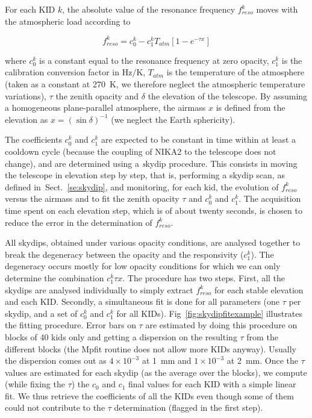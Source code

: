 For each KID $k$, the absolute value of the resonance frequency
$f_{reso}^k$ moves with the atmospheric load according to

\begin{equation}
f_{reso}^k  = c_0^k - c_1^k T_{atm}[1-e^{-\tau x}]
\label{eq:skydip}
\end{equation}


where $c_0^k$ is a constant equal to the resonance frequency at zero
opacity, $c_1^k$ is the calibration conversion factor in Hz$/$K,
$T_{atm}$ is the temperature of the atmosphere (taken as a constant at
270~K, we therefore neglect the atmospheric temperature variations),
$\tau$ the zenith opacity and $\delta$ the elevation of the
telescope.  By assuming a homogeneous plane-parallel atmosphere, the
airmass $x$ is defined from the elevation as $x
= \left(\sin\delta\right)^{-1}$ (we neglect the Earth sphericity).

The coefficients $c_0^k$ and $c_1^k$ are expected to be constant in
time within at least a cooldown cycle (because the coupling of NIKA2
to the telescope does not change), and are determined using a {\emph
skydip} procedure. This consists in moving the telescope in elevation
step by step, that is, performing a skydip scan, as defined
in~Sect.~\ref{se:skydip}, and monitoring, for each kid, the evolution
of $f_{reso}^k$ versus the airmass and to fit the zenith opacity
$\tau$ and $c_0^k$ and $c_1^k$. The acquisition time spent on each
elevation step, which is of about twenty seconds, is chosen to reduce
the error in the determination of $f_{reso}^k$.

All skydips, obtained under various opacity conditions, are analysed
together to break the degeneracy between the opacity and the
responsivity ($c_1^k$). The degeneracy occurs mostly for low opacity
conditions for which we can only determine the combination $c_1^k \tau
x$. The procedure has two steps.  First, all the skydips are analysed
individually to simply extract $f_{reso}^k$ for each stable elevation
and each KID. Secondly, a simultaneous fit is done for all parameters
(one $\tau$ per skydip, and a set of $c_0^k$ and $c_1^k$ for all
KIDs). Fig~\ref{fig:skydipfitexample} illustrates the fitting
procedure.  Error bars on $\tau$ are estimated by doing this procedure
on blocks of 40 kids only and getting a dispersion on the resulting
$\tau$ from the different blocks (the Mpfit routine does not allow
more KIDs anyway). Usually the dispersion comes out as $4\times
10^{-3}$ at 1~mm and $1\times 10^{-3}$ at 2~mm. Once the $\tau$ values
are estimated for each skydip (as the average over the blocks), we
compute (while fixing the $\tau$) the $c_0$ and $c_1$ final values for
each KID with a simple linear fit. We thus retrieve the coefficients
of all the KIDs even though some of them could not contribute to the
$\tau$ determination (flagged in the first step).


